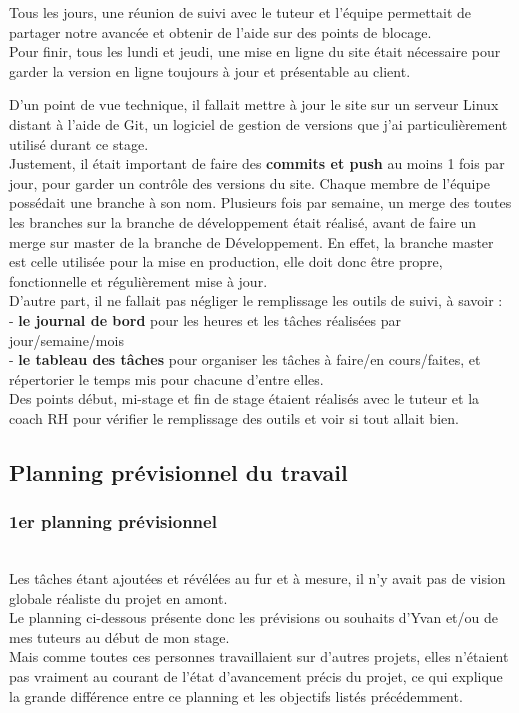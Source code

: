 Tous les jours, une réunion de suivi avec le tuteur et l'équipe permettait de partager notre avancée et obtenir de l'aide sur des points de blocage.\\

Pour finir, tous les lundi et jeudi, une mise en ligne du site était nécessaire pour garder la version en ligne toujours à jour et présentable au client.

D'un point de vue technique, il fallait mettre à jour le site sur un serveur Linux distant à l'aide de Git, un logiciel de gestion de versions que j'ai particulièrement utilisé durant ce stage. \\

Justement, il était important de faire des \textbf{commits et push} au moins 1 fois par jour, pour garder un contrôle des versions du site.
Chaque membre de l'équipe possédait une branche à son nom. Plusieurs fois par semaine, un merge des toutes les branches sur la branche de développement était réalisé, avant de faire un merge sur master de la branche de Développement.
En effet, la branche master est celle utilisée pour la mise en production, elle doit donc être propre, fonctionnelle et régulièrement mise à jour. \\

D'autre part, il ne fallait pas négliger le remplissage les outils de suivi, à savoir : \\
- \textbf{le journal de bord} pour les heures et les tâches réalisées par jour/semaine/mois\\ 
- \textbf{le tableau des tâches} pour organiser les tâches à faire/en cours/faites, et répertorier le temps mis pour chacune d'entre elles.\\

Des points début, mi-stage et fin de stage étaient réalisés avec le tuteur et la coach RH pour vérifier le remplissage des outils et voir si tout allait bien.


\pagebreak
\subsection{Planning prévisionnel du travail}

\subsubsection{1er planning prévisionnel}
~\\

Les tâches étant ajoutées et révélées au fur et à mesure, il n'y avait pas de vision globale réaliste du projet en amont.\\
Le planning ci-dessous présente donc les prévisions ou souhaits d'Yvan et/ou de mes tuteurs au début de mon stage.\\ 
Mais comme toutes ces personnes travaillaient sur d'autres projets, elles n'étaient pas vraiment au courant de l'état d'avancement précis du projet, ce qui explique la grande différence entre ce planning et les objectifs listés précédemment.

